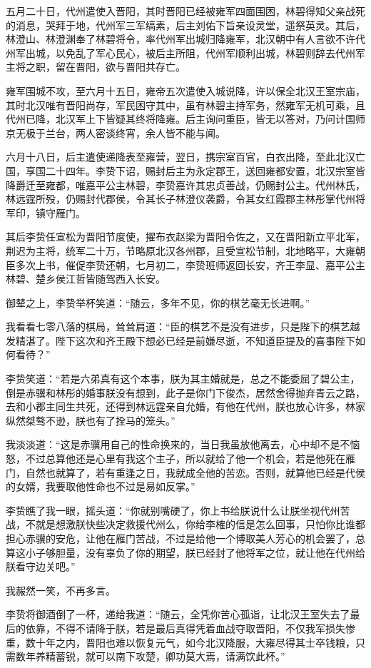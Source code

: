 五月二十日，代州遣使入晋阳，其时晋阳已经被雍军四面围困，林碧得知父亲战死的消息，哭拜于地，代州军三军缟素，后主刘佑下旨亲设灵堂，遥祭英灵。其后，林澄山、林澄渊奉了林碧将令，率代州军出城归降雍军，北汉朝中有人言欲不许代州军出城，以免乱了军心民心，被后主所阻，代州军顺利出城，林碧则辞去代州军主将之职，留在晋阳，欲与晋阳共存亡。

雍军围城不攻，至六月十五日，雍帝五次遣使入城说降，许以保全北汉王室宗庙，其时北汉唯有晋阳尚存，军民困守其中，虽有林碧主持军务，然雍军无机可乘，且代州已降，北汉军上下皆疑其终将降雍。后主询问重臣，皆无以答对，乃问计国师京无极于兰台，两人密谈终宵，余人皆不能与闻。

六月十八日，后主遣使递降表至雍营，翌日，携宗室百官，白衣出降，至此北汉亡国，享国二十四年。李贽下诏，赐封后主为永定郡王，送回雍都安置，北汉宗室皆降爵迁至雍都，唯嘉平公主林碧，李贽嘉许其忠贞善战，仍赐封公主。代州林氏，林远霆所殁，仍赐封代郡侯，令其长子林澄仪袭爵，令其女红霞郡主林彤掌代州将军印，镇守雁门。

其后李贽任宣松为晋阳节度使，擢布衣赵梁为晋阳令佐之，又在晋阳新立平北军，荆迟为主将，统军二十万，节略原北汉各州郡，且受宣松节制，北地略平，大雍朝臣多次上书，催促李贽还朝，七月初二，李贽班师返回长安，齐王李显、嘉平公主林碧、楚乡侯江哲皆随驾西入长安。

御辇之上，李贽举杯笑道：“随云，多年不见，你的棋艺毫无长进啊。”

我看看七零八落的棋局，耸耸肩道：“臣的棋艺不是没有进步，只是陛下的棋艺越发精湛了。陛下这次和齐王殿下想必已经是前嫌尽逝，不知道臣提及的喜事陛下如何看待？”

李贽笑道：“若是六弟真有这个本事，朕为其主婚就是，总之不能委屈了碧公主，倒是赤骥和林彤的婚事朕没有想到，此子是你门下俊杰，居然舍得抛弃青云之路，去和小郡主同生共死，还得到林远霆亲自允婚，有他在代州，朕也放心许多，林家纵然桀骜不逊，朕也有了拴马的笼头。”

我淡淡道：“这是赤骥用自己的性命换来的，当日我虽放他离去，心中却不是不恼怒，不过总算他还是心里有我这个主子，所以就给了他一个机会，若是他死在雁门，自然也就算了，若有重逢之日，我就成全他的苦恋。否则，就算他已经是代侯的女婿，我要取他性命也不过是易如反掌。”

李贽瞧了我一眼，摇头道：“你就别嘴硬了，你上书给朕说什么让朕坐视代州苦战，不就是想激朕快些决定救援代州么，你给李榷的信是怎么回事，只怕你比谁都担心赤骥的安危，让他在雁门苦战，不过是给他一个博取美人芳心的机会罢了，总算这小子够胆量，没有辜负了你的期望，朕已经封了他将军之位，就让他在代州给朕看守边关吧。”

我赧然一笑，不再多言。

李贽将御酒倒了一杯，递给我道：“随云，全凭你苦心孤诣，让北汉王室失去了最后的依靠，不得不请降于朕，若是最后真得凭着血战夺取晋阳，不仅我军损失惨重，数十年之内，晋阳也难以恢复元气，如今北汉降服，大雍尽得其士卒钱粮，只需数年养精蓄锐，就可以南下攻楚，卿功莫大焉，请满饮此杯。”

